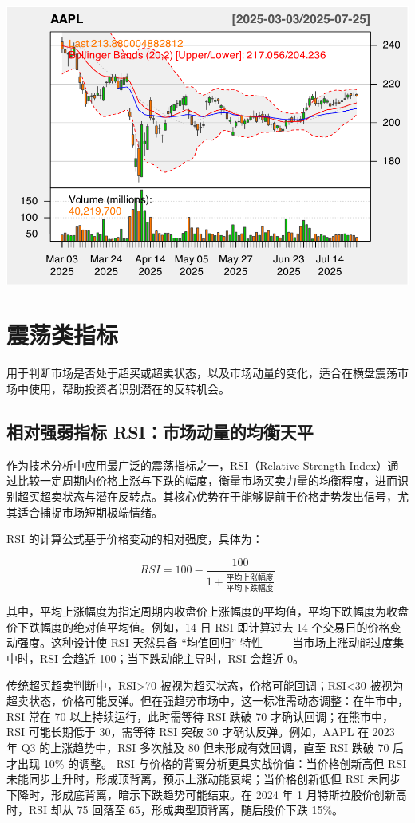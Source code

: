 \documentclass[]{ctexbook}
\begin{document}
\includegraphics[width=0.9\linewidth]{QuantmodHandbook_files/figure-latex/evwma_2-4}

\section{震荡类指标}\label{ux9707ux8361ux7c7bux6307ux6807}

用于判断市场是否处于超买或超卖状态，以及市场动量的变化，适合在横盘震荡市场中使用，帮助投资者识别潜在的反转机会。

\subsection{相对强弱指标 RSI：市场动量的均衡天平}\label{ux76f8ux5bf9ux5f3aux5f31ux6307ux6807-rsiux5e02ux573aux52a8ux91cfux7684ux5747ux8861ux5929ux5e73}

作为技术分析中应用最广泛的震荡指标之一，RSI（Relative Strength Index）通过比较一定周期内价格上涨与下跌的幅度，衡量市场买卖力量的均衡程度，进而识别超买超卖状态与潜在反转点。其核心优势在于能够提前于价格走势发出信号，尤其适合捕捉市场短期极端情绪。

RSI 的计算公式基于价格变动的相对强度，具体为：

\[RSI = 100 - \frac{100}{1 + \frac{\text{平均上涨幅度}}{\text{平均下跌幅度}}}
\]

其中，平均上涨幅度为指定周期内收盘价上涨幅度的平均值，平均下跌幅度为收盘价下跌幅度的绝对值平均值。例如，14 日 RSI 即计算过去 14 个交易日的价格变动强度。这种设计使 RSI 天然具备 ``均值回归'' 特性 ------ 当市场上涨动能过度集中时，RSI 会趋近 100；当下跌动能主导时，RSI 会趋近 0。

传统超买超卖判断中，RSI\textgreater70 被视为超买状态，价格可能回调；RSI\textless30 被视为超卖状态，价格可能反弹。但在强趋势市场中，这一标准需动态调整：在牛市中，RSI 常在 70 以上持续运行，此时需等待 RSI 跌破 70 才确认回调；在熊市中，RSI 可能长期低于 30，需等待 RSI 突破 30 才确认反弹。例如，AAPL 在 2023 年 Q3 的上涨趋势中，RSI 多次触及 80 但未形成有效回调，直至 RSI 跌破 70 后才出现 10\% 的调整。
RSI 与价格的背离分析更具实战价值：当价格创新高但 RSI 未能同步上升时，形成顶背离，预示上涨动能衰竭；当价格创新低但 RSI 未同步下降时，形成底背离，暗示下跌趋势可能结束。在 2024 年 1 月特斯拉股价创新高时，RSI 却从 75 回落至 65，形成典型顶背离，随后股价下跌 15\%。
\end{document}

